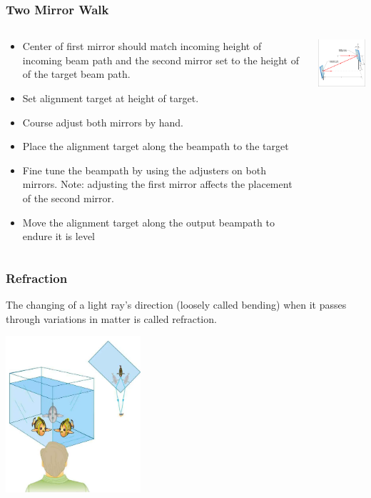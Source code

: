 \documentclass{beamer}
\begin{document}
\begin{frame}\frametitle{Two Mirror Walk}
\begin{columns}
\begin{column}{8cm}
\begin{itemize}
\item Center of first mirror should match incoming height of incoming beam path and the second mirror set to the height of of the target beam path.
\item Set alignment target at height of target.
\item Course adjust both mirrors by hand.
\item Place the alignment target along the beampath to the target
\item Fine tune the beampath by using the adjusters on both mirrors. Note: adjusting the first mirror affects the placement of the second mirror. 
\item Move the alignment target along the output beampath to endure it is level
\end{itemize}

\end{column}
\begin{column}{4cm}
\begin{center}
\includegraphics[width=3.8cm]{fig/twoMirror.jpg}
\end{center}
\end{column}
\end{columns}

\end{frame}

\begin{frame}\frametitle{Refraction}
The changing of a light ray’s direction (loosely called bending) when it passes through variations in matter is called refraction.

\begin{center}
\includegraphics[width=5cm]{fig/fish.png}
\end{center}

\end{frame}
\end{document}

